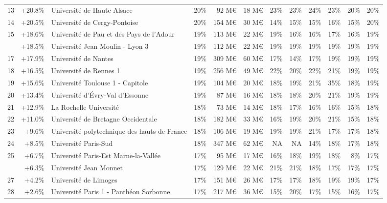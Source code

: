 \documentclass[12pt,french,landscape]{article}
\begin{document}
\begin{longtable}{rrlrrrrrrlrr}
\rowcolor{gray!6}  13 & +20.8\% & Université de Haute-Alsace & 20\% & 92 M€ & 18 M€ & 23\% & 23\% & 24\% & 23\% & 20\% & 20\%\\
14 & +20.5\% & Université de Cergy-Pontoise & 20\% & 154 M€ & 30 M€ & 14\% & 15\% & 15\% & 16\% & 15\% & 20\%\\
\rowcolor{gray!6}  15 & +18.6\% & Université de Pau et des Pays de l'Adour & 19\% & 113 M€ & 22 M€ & 19\% & 16\% & 16\% & 17\% & 16\% & 19\%\\
\addlinespace
16 & +18.5\% & Université Jean Moulin - Lyon 3 & 19\% & 112 M€ & 22 M€ & 19\% & 19\% & 19\% & 19\% & 19\% & 19\%\\
\rowcolor{gray!6}  17 & +17.9\% & Université de Nantes & 19\% & 309 M€ & 60 M€ & 17\% & 14\% & 17\% & 19\% & 19\% & 19\%\\
18 & +16.5\% & Université de Rennes 1 & 19\% & 256 M€ & 49 M€ & 22\% & 20\% & 22\% & 21\% & 19\% & 19\%\\
\rowcolor{gray!6}  19 & +15.6\% & Université Toulouse 1 - Capitole & 19\% & 104 M€ & 20 M€ & 18\% & 19\% & 21\% & 35\% & 18\% & 19\%\\
20 & +13.4\% & Université d'Évry-Val d'Essonne & 19\% & 87 M€ & 16 M€ & 18\% & 18\% & 20\% & 21\% & 19\% & 19\%\\
\addlinespace
\rowcolor{gray!6}  21 & +12.9\% & La Rochelle Université & 18\% & 73 M€ & 14 M€ & 18\% & 17\% & 16\% & 16\% & 15\% & 18\%\\
22 & +11.0\% & Université de Bretagne Occidentale & 18\% & 182 M€ & 33 M€ & 16\% & 19\% & 20\% & 21\% & 15\% & 18\%\\
\rowcolor{gray!6}  23 & +9.6\% & Université polytechnique des hauts de France & 18\% & 106 M€ & 19 M€ & 19\% & 19\% & 21\% & 17\% & 17\% & 18\%\\
24 & +8.5\% & Université Paris-Sud & 18\% & 347 M€ & 62 M€ & NA & NA & 14\% & 18\% & 17\% & 18\%\\
\rowcolor{gray!6}  25 & +6.7\% & Université Paris-Est Marne-la-Vallée & 17\% & 95 M€ & 17 M€ & 16\% & 18\% & 19\% & 18\% & 8\% & 17\%\\
\addlinespace
26 & +6.3\% & Université Jean Monnet & 17\% & 129 M€ & 22 M€ & 21\% & 21\% & 18\% & 17\% & 17\% & 17\%\\
\rowcolor{gray!6}  27 & +4.2\% & Université de Limoges & 17\% & 151 M€ & 26 M€ & 17\% & 17\% & 18\% & 19\% & 19\% & 17\%\\
28 & +2.6\% & Université Paris 1 - Panthéon Sorbonne & 17\% & 217 M€ & 36 M€ & 15\% & 20\% & 17\% & 15\% & 16\% & 17\%\\

\end{longtable}
\end{document}
